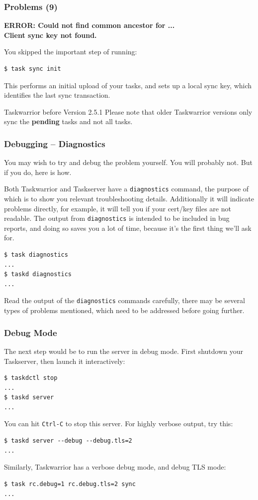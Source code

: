 \documentclass[t,handout]{beamer}
\begin{document}
\begin{frame}[fragile]\frametitle{Problems (9)}
    \vfill
    \textbf{ERROR: Could not find common ancestor for ...\\
Client sync key not found.}

    You skipped the important step of running:
    \begin{lstlisting}
$ task sync init\end{lstlisting}

    This performs an initial upload of your tasks, and sets up a local sync key, which identifies the last sync transaction.

    \begin{alertblock}{Taskwarrior before Version 2.5.1}
        Please note that older Taskwarrior versions only sync the \textbf{pending} tasks and not all tasks.
    \end{alertblock}
\end{frame}

\begin{frame}[fragile]\frametitle{Debugging -- Diagnostics}
    \vfill
    You may wish to try and debug the problem yourself. You will probably not. But if you do, here is how.

    Both Taskwarrior and Taskserver have a \verb+diagnostics+ command, the purpose of which is to show you relevant troubleshooting details. Additionally it will indicate problems directly, for example, it will tell you if your cert/key files are not readable. The output from \verb+diagnostics+ is intended to be included in bug reports, and doing so saves you a lot of time, because it's the first thing we'll ask for.

    \begin{lstlisting}
$ task diagnostics
...
$ taskd diagnostics
...\end{lstlisting}

    Read the output of the \verb+diagnostics+ commands carefully, there may be several types of problems mentioned, which need to be addressed before going further.
\end{frame}

\begin{frame}[fragile]\frametitle{Debug Mode}
    \vfill
    The next step would be to run the server in debug mode. First shutdown your Taskserver, then launch it interactively:

    \begin{lstlisting}
$ taskdctl stop
...
$ taskd server
...\end{lstlisting}

    You can hit \verb+Ctrl-C+ to stop this server. For highly verbose output, try this:
    \begin{lstlisting}
$ taskd server --debug --debug.tls=2
...\end{lstlisting}

    Similarly, Taskwarrior has a verbose debug mode, and debug TLS mode:
    \begin{lstlisting}
$ task rc.debug=1 rc.debug.tls=2 sync
...\end{lstlisting}
\end{frame}
\end{document}

